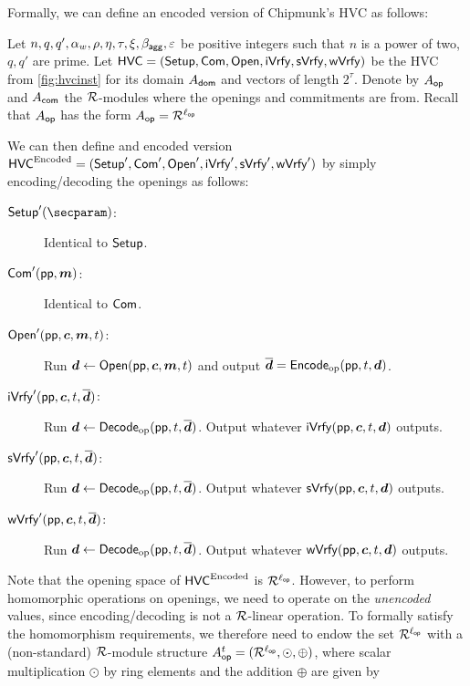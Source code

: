 Formally, we can define an encoded version of Chipmunk's HVC as follows:
\begin{definition}\label{def:encodedhvc}
Let $n,q,q',\alpha_w,\rho,\eta,\tau,\xi,\beta_{\mathsf{agg}},\varepsilon$ be positive integers such that $n$ is a power of two, $q,q'$ are prime.
Let $\mathsf{HVC} = (\mathsf{Setup},\mathsf{Com},\mathsf{Open},\mathsf{iVrfy},\mathsf{sVrfy}, \mathsf{wVrfy})$ be the HVC from \autoref{fig:hvcinst} for its domain $A_{\mathsf{dom}}$ and vectors of length $2^\tau$. Denote by $A_{\mathsf{op}}$ and $A_{\mathsf{com}}$ the $\mathcal{R}$-modules where the openings and commitments are from. Recall that $A_{\mathsf{op}}$ has the form $A_{\mathsf{op}} = \mathcal{R}^{\ell_{\mathsf{op}}}$

We can then define and encoded version $\mathsf{HVC}^{\textrm{Encoded}} = (\mathsf{Setup}',\mathsf{Com}',\mathsf{Open}',\mathsf{iVrfy}',\mathsf{sVrfy}', \mathsf{wVrfy}')$ by simply encoding/decoding the openings as follows:
\begin{description}
    \item[$\setup'(\secparam)$:] Identical to $\mathsf{Setup}$.
    \item[$\mathsf{Com}'(\mathsf{pp}, \boldsymbol{m})$:] Identical to $\mathsf{Com}$.
    \item[$\mathsf{Open}'(\mathsf{pp},\boldsymbol{c},\boldsymbol{m},t)$:] Run $\boldsymbol{d}\gets\mathsf{Open}(\mathsf{pp},\boldsymbol{c},\boldsymbol{m},t)$ and output $\overline{\boldsymbol{d}} = \mathsf{Encode}_{\mathrm{op}}(\mathsf{pp}, t, \boldsymbol{d})$.
    \item[$\mathsf{iVrfy}'(\mathsf{pp}, \boldsymbol{c},t,\overline{\boldsymbol{d}})$:] Run $\boldsymbol{d}\gets\mathsf{Decode}_{\mathrm{op}}(\mathsf{pp},t,\overline{\boldsymbol{d}})$. Output whatever $\mathsf{iVrfy}(\mathsf{pp},\boldsymbol{c},t,\boldsymbol{d})$ outputs.
    \item[$\mathsf{sVrfy}'(\mathsf{pp}, \boldsymbol{c},t,\overline{\boldsymbol{d}})$:] Run $\boldsymbol{d}\gets\mathsf{Decode}_{\mathrm{op}}(\mathsf{pp},t,\overline{\boldsymbol{d}})$. Output whatever $\mathsf{sVrfy}(\mathsf{pp},\boldsymbol{c},t,\boldsymbol{d})$ outputs.
    \item[$\mathsf{wVrfy}'(\mathsf{pp}, \boldsymbol{c},t,\overline{\boldsymbol{d}})$:] Run $\boldsymbol{d}\gets\mathsf{Decode}_{\mathrm{op}}(\mathsf{pp},t,\overline{\boldsymbol{d}})$. Output whatever $\mathsf{wVrfy}(\mathsf{pp},\boldsymbol{c},t,\boldsymbol{d})$ outputs.
\end{description}
\end{definition}
Note that the opening space of $\mathsf{HVC}^{\textrm{Encoded}}$ is $\mathcal{R}^{\ell_{\mathsf{op}}}$.
However, to perform homomorphic operations on openings, we need to operate on the \emph{unencoded} values, since encoding/decoding is not a $\mathcal{R}$-linear operation.
To formally satisfy the homomorphism requirements, we therefore need to endow the set $\mathcal{R}^{\ell_{\mathsf{op}}}$ with a (non-standard) $\mathcal{R}$-module structure $A_{\mathsf{op}}^{t} = (\mathcal{R}^{\ell_{\mathsf{op}}}, \odot, \oplus)$, where scalar multiplication $\odot$ by ring elements and the addition $\oplus$ are given by
